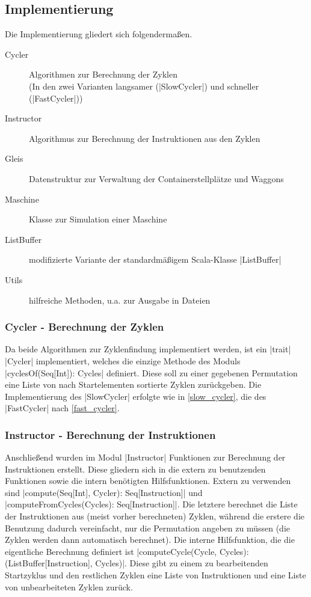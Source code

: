 \subsection{Implementierung}
Die Implementierung gliedert sich folgendermaßen.
\begin{description}
 \item[Cycler] Algorithmen zur Berechnung der Zyklen \\
               (In den zwei Varianten langsamer (|SlowCycler|) und schneller (|FastCycler|))
 \item[Instructor] Algorithmus zur Berechnung der Instruktionen aus den Zyklen
 \item[Gleis] Datenstruktur zur Verwaltung der Containerstellplätze und Waggons
 \item[Maschine] Klasse zur Simulation einer Maschine
 \item[ListBuffer] modifizierte Variante der standardmäßigem Scala-Klasse |ListBuffer|
 \item[Utils] hilfreiche Methoden, u.a. zur Ausgabe in Dateien
\end{description}

\subsubsection{Cycler - Berechnung der Zyklen}
Da beide Algorithmen zur Zyklenfindung implementiert werden, ist ein |trait| |Cycler| implementiert,
welches die einzige Methode des Moduls |cyclesOf(Seq[Int]): Cycles| definiert.
Diese soll zu einer gegebenen Permutation eine Liste von nach Startelementen sortierte Zyklen zurückgeben.
Die Implementierung des |SlowCycler| erfolgte wie in \ref{slow_cycler}, die des |FastCycler| nach \ref{fast_cycler}.

\subsubsection{Instructor - Berechnung der Instruktionen}
Anschließend wurden im Modul |Instructor| Funktionen zur Berechnung der Instruktionen erstellt.
Diese gliedern sich in die extern zu benutzenden Funktionen sowie die intern benötigten Hilfsfunktionen.
Extern zu verwenden sind |compute(Seq[Int], Cycler): Seq[Instruction]| und |computeFromCycles(Cycles): Seq[Instruction]|.
Die letztere berechnet die Liste der Instruktionen aus (meist vorher berechneten) Zyklen,
während die erstere die Benutzung dadurch vereinfacht, nur die Permutation angeben zu müssen (die Zyklen werden dann automatisch berechnet).
Die interne Hilfsfunktion, die die eigentliche Berechnung definiert ist |computeCycle(Cycle, Cycles): (ListBuffer[Instruction], Cycles)|.
Diese gibt zu einem zu bearbeitenden Startzyklus und den restlichen Zyklen eine Liste von Instruktionen und eine Liste von unbearbeiteten Zyklen zurück.

